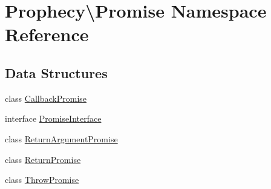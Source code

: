 \hypertarget{namespace_prophecy_1_1_promise}{}\section{Prophecy\textbackslash{}Promise Namespace Reference}
\label{namespace_prophecy_1_1_promise}
\subsection*{Data Structures}
\begin{DoxyCompactItemize}
\item 
class \mbox{\hyperlink{class_prophecy_1_1_promise_1_1_callback_promise}{Callback\+Promise}}
\item 
interface \mbox{\hyperlink{interface_prophecy_1_1_promise_1_1_promise_interface}{Promise\+Interface}}
\item 
class \mbox{\hyperlink{class_prophecy_1_1_promise_1_1_return_argument_promise}{Return\+Argument\+Promise}}
\item 
class \mbox{\hyperlink{class_prophecy_1_1_promise_1_1_return_promise}{Return\+Promise}}
\item 
class \mbox{\hyperlink{class_prophecy_1_1_promise_1_1_throw_promise}{Throw\+Promise}}
\end{DoxyCompactItemize}
